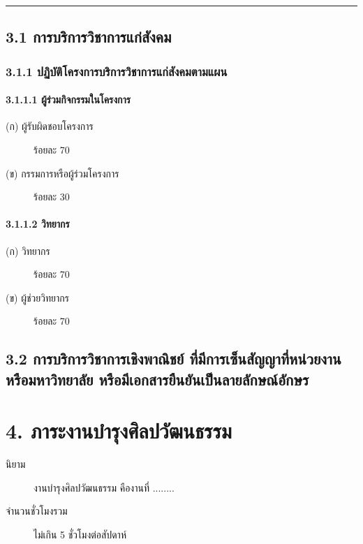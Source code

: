 \documentclass[a4paper,12pt,english]{sphinxmanual}
\begin{document}
\bigskip\hrule\bigskip



\section{3.1 การบริการวิชาการแก่สังคม}
\label{\detokenize{3service:id5}}

\subsection{3.1.1 ปฏิบัติโครงการบริการวิชาการแก่สังคมตามแผน}
\label{\detokenize{3service:id6}}

\subsubsection{3.1.1.1 ผู้ร่วมกิจกรรมในโครงการ}
\label{\detokenize{3service:id7}}\begin{description}
\item[{(ก) ผู้รับผิดชอบโครงการ}] \leavevmode
ร้อยละ 70

\item[{(ข) กรรมการหรือผู้ร่วมโครงการ}] \leavevmode
ร้อยละ 30

\end{description}


\subsubsection{3.1.1.2 วิทยากร}
\label{\detokenize{3service:id8}}\begin{description}
\item[{(ก) วิทยากร}] \leavevmode
ร้อยละ 70

\item[{(ข) ผู้ช่วยวิทยากร}] \leavevmode
ร้อยละ 70

\end{description}


\section{3.2 การบริการวิชาการเชิงพาณิชย์ ที่มีการเซ็นสัญญาที่หน่วยงาน หรือมหาวิทยาลัย หรือมีเอกสารยืนยันเป็นลายลักษณ์อักษร}
\label{\detokenize{3service:id9}}

\chapter{4. ภาระงานบำรุงศิลปวัฒนธรรม}
\label{\detokenize{4culture:id1}}\label{\detokenize{4culture::doc}}\begin{description}
\item[{นิยาม}] \leavevmode
งานบำรุงศิลปวัฒนธรรม คืองานที่ ........

\item[{จำนวนชั่วโมงรวม}] \leavevmode
ไม่เกิน 5 ชั่วโมงต่อสัปดาห์

\end{description}
\end{document}
